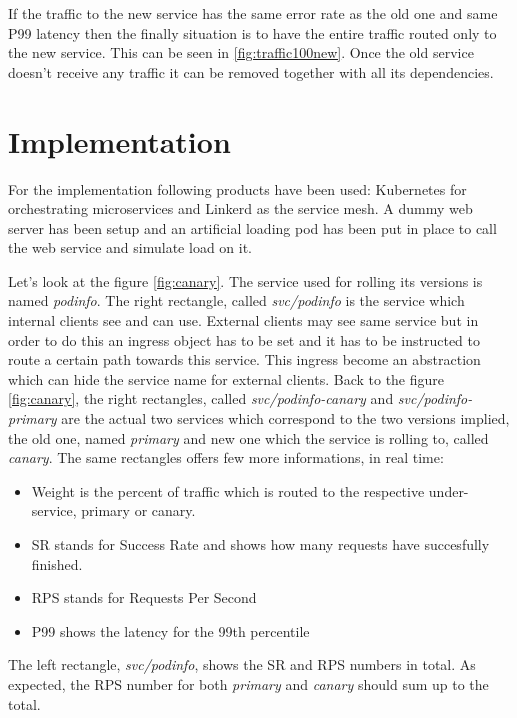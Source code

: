 \documentclass[conference]{IEEEtran}
\begin{document}
    If the traffic to the new service has the same error rate as the old one and same P99 latency then the finally situation is to have the entire traffic routed only to the new service. This can be seen in \ref{fig:traffic100new}. Once the old service doesn't receive any traffic it can be removed together with all its dependencies.

\section{Implementation}
\label{sec:implementation}

    For the implementation following products have been used: Kubernetes \cite{b9} for orchestrating microservices and Linkerd \cite{b16} as the service mesh. A dummy web server has been setup and an artificial loading pod has been put in place to call the web service and simulate load on it.

    Let's look at the figure \ref{fig:canary}. The service used for rolling its versions is named \textit{podinfo}. The right rectangle, called \textit{svc/podinfo} is the service which internal clients see and can use. External clients may see same service but in order to do this an ingress object has to be set and it has to be instructed to route a certain path towards this service. This ingress become an abstraction which can hide the service name for external clients. Back to the figure \ref{fig:canary}, the right rectangles, called \textit{svc/podinfo-canary} and \textit{svc/podinfo-primary} are the actual two services which correspond to the two versions implied, the old one, named \textit{primary} and new one which the service is rolling to, called \textit{canary}. The same rectangles offers few more informations, in real time:

    \begin{itemize}
        \item Weight is the percent of traffic which is routed to the respective under-service, primary or canary.
        \item SR stands for Success Rate and shows how many requests have succesfully finished.
        \item RPS stands for Requests Per Second
        \item P99 shows the latency for the 99th percentile
    \end{itemize}

    The left rectangle, \textit{svc/podinfo}, shows the SR and RPS numbers in total. As expected, the RPS number for both \textit{primary} and \textit{canary} should sum up to the total.
\end{document}
